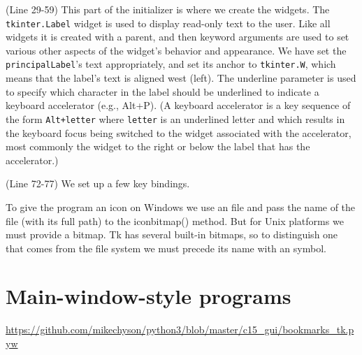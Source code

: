 (Line 29-59)
This part of the initializer is where we create the widgets.
The \verb|tkinter.Label| widget is used to display read-only text to the user.
Like all widgets it is created with a parent, and then keyword arguments are used to set various other aspects of the widget’s behavior and appearance.
We have set the \verb|principalLabel|’s text appropriately, and set its anchor to \verb|tkinter.W|, which means that the label’s text is aligned west (left).
The underline parameter is used to specify which character in the label should be underlined to indicate a keyboard accelerator (e.g., Alt+P).
(A keyboard accelerator is a key sequence of the form \verb|Alt+letter| where \verb|letter| is an underlined letter and which results in the keyboard focus being switched to the widget associated with the accelerator, most commonly the widget to the right or below the label that has the accelerator.)


(Line 72-77)
We set up a few key bindings.


To give the program an icon on Windows we use an  file and pass the name of the file (with its full path) to the iconbitmap() method.
But for Unix platforms we must provide a bitmap.
Tk has several built-in bitmaps, so to distinguish one that comes from the file system we must precede its name with an  symbol.



\section{Main-window-style programs}

\url{https://github.com/mikechyson/python3/blob/master/c15_gui/bookmarks_tk.pyw}